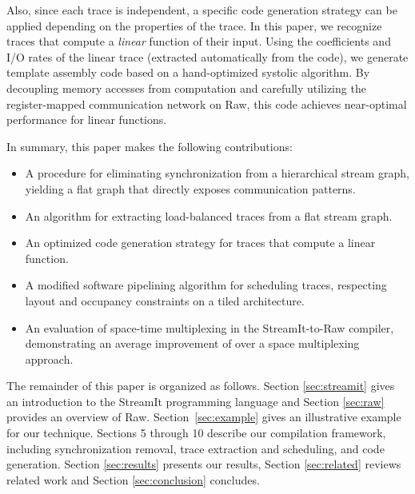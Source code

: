 Also, since each trace is independent, a specific code generation
strategy can be applied depending on the properties of the trace.  In
this paper, we recognize traces that compute a {\it linear} function
of their input.  Using the coefficients and I/O rates of the linear
trace (extracted automatically from the code), we generate template
assembly code based on a hand-optimized systolic algorithm.  By
decoupling memory accesses from computation and carefully utilizing
the register-mapped communication network on Raw, this code achieves
near-optimal performance for linear functions.

In summary, this paper makes the following contributions:

\begin{itemize}
\item A procedure for eliminating synchronization from a hierarchical
stream graph, yielding a flat graph that directly exposes
communication patterns.
\item An algorithm for extracting load-balanced traces from a flat
stream graph.
\item An optimized code generation strategy for traces that compute a
linear function.
\item A modified software pipelining algorithm for scheduling traces,
respecting layout and occupancy constraints on a tiled architecture.
\item An evaluation of space-time multiplexing in the StreamIt-to-Raw
compiler, demonstrating an average improvement of  over a
space multiplexing approach.
\end{itemize}

The remainder of this paper is organized as follows.  Section
\ref{sec:streamit} gives an introduction to the StreamIt programming
language and Section \ref{sec:raw} provides an overview of
Raw. Section~\ref{sec:example} gives an illustrative example for our
technique.  Sections 5 through 10 describe our compilation framework,
including synchronization removal, trace extraction and scheduling,
and code generation.  Section \ref{sec:results} presents our results,
Section \ref{sec:related} reviews related work and Section
\ref{sec:conclusion} concludes.



